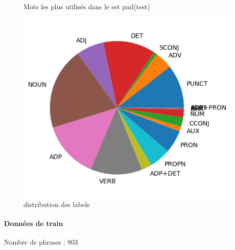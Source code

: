 \begin{figure}[H]
\begin{minipage}{0.48\textwidth}
\begin{tabular}{|l || *{11 }{|c} |}
\end{tabular}
\caption{ Mots les plus utilisés dans le set pud(test) } \label{Fig:muw}\end{minipage} 
\begin{minipage}{0.48\textwidth} \centering
\includegraphics[width=.7\linewidth]{pudtest_img.png}
\caption{distribution des labels}
\end{minipage}
\end{figure} \paragraph{Données de train \\ }  
 Nombre de phrases : 803\\ 
